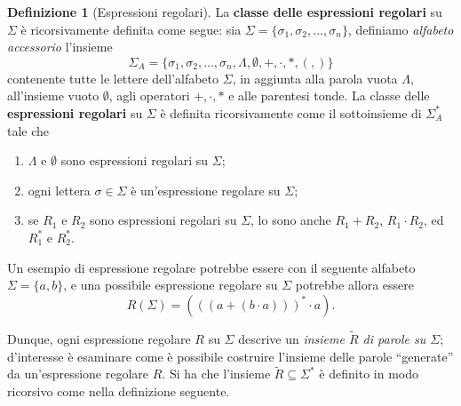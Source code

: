 \documentclass[10pt]{\classname}
\theoremstyle{definition}
\newtheorem{definizione}{Definizione}[section]
\theoremstyle{definition}
\theoremstyle{definition}
\theoremstyle{definition}
\begin{document}
\begin{definizione}[Espressioni regolari]\label{def:espressioni-regolari}
La \textbf{classe delle espressioni regolari} su $\Sigma$ è ricorsivamente definita come segue: sia $\Sigma = \{\sigma_1, \sigma_2, \dots, \sigma_n\}$, definiamo \emph{alfabeto accessorio} l'insieme \[\Sigma_A = \{\sigma_1, \sigma_2, \dots, \sigma_n, \Lambda, \emptyset, +, \cdot, *, (, )\}\] contenente tutte le lettere dell'alfabeto $\Sigma$, in aggiunta alla parola vuota $\Lambda$, all'insieme vuoto $\emptyset$, agli operatori $+, \cdot, *$ e alle parentesi tonde. La classe delle \textbf{espressioni regolari} su $\Sigma$ è definita ricorsivamente come il sottoinsieme di $\Sigma_A^*$ tale che 
\begin{enumerate}
    \item $\Lambda$ e $\emptyset$ sono espressioni regolari su $\Sigma$;
    \item ogni lettera $\sigma \in \Sigma$ è un'espressione regolare su
        $\Sigma$;
    \item se $R_1$ e $R_2$ sono espressioni regolari su $\Sigma$, lo sono anche
        $R_1 + R_2$, $R_1 \cdot R_2$, ed $R_1^*$ e $R_2^*$.
\end{enumerate}
\end{definizione}

Un esempio di espressione regolare potrebbe essere con il seguente alfabeto $\Sigma = \{a,b\}$, e una possibile espressione regolare su $\Sigma$ potrebbe allora essere \[R (\Sigma) = (((a + (b\cdot a)))^*\cdot a).\]

Dunque, ogni espressione regolare $R$ su $\Sigma$ descrive un \emph{insieme $\tilde{R}$ di parole su $\Sigma$}; d'interesse è esaminare come è possibile costruire l'insieme delle parole ``generate'' da un'espressione regolare $R$. Si ha che l'insieme $\tilde{R}\subseteq \Sigma^*$ è definito in modo ricorsivo come nella definizione seguente.
\end{document}
